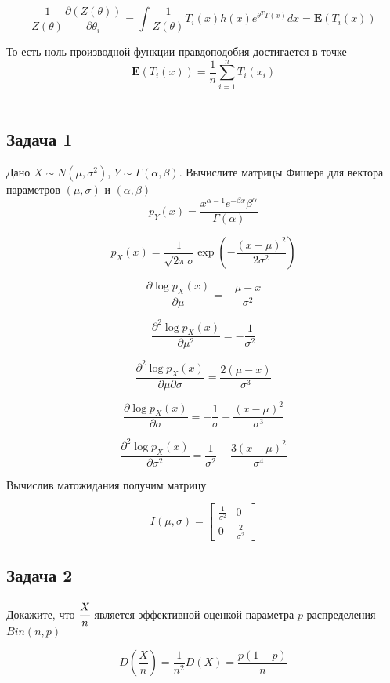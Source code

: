 \documentclass[
paper = a4,
fontsize = 12pt,
headinclude = true,
open = right,
twoside = true,
BCOR = 10mm,
toc = listofnumbered,
toc = bibnumbered,
numbers = noendperiod
]{scrreprt}
\begin{document}
	$$\frac{1}{Z(\theta)}\frac{\partial(Z(\theta))}{\partial \theta_{i}} =  \int \frac{1}{Z(\theta)}T_{i}(x)h(x)e^{\theta^{T}T(x)}dx = \mathbf{E}(T_{i}(x))$$
	
	То есть ноль производной функции правдоподобия достигается в точке
	$$\mathbf{E}(T_{i}(x)) = \frac{1}{n}\sum_{i = 1}^{n}T_{i}(x_{i})$$
	\\
	
		
	
	\subsection*{Задача 1}
	
	Дано $X \sim N(\mu, \sigma^{2})$, $Y\sim\Gamma(\alpha, \beta)$. Вычислите матрицы Фишера для вектора параметров $(\mu, \sigma)$ и $(\alpha, \beta)$
	$$p_{Y}(x) = \frac{x^{\alpha - 1}e^{-\beta x}\beta^{\alpha}}{\Gamma(\alpha)}$$
	
	$$p_{X}(x) = \frac{1}{\sqrt{2\pi}\sigma}\exp\left(-\frac{(x - \mu)^{2}}{2\sigma^{2}}\right)$$
	
	$$\frac{\partial \log p_{X}(x)}{\partial \mu} = -\frac{\mu - x}{\sigma^{2}}$$
	
	$$\frac{\partial^{2} \log p_{X}(x)}{\partial \mu^{2}} = -\frac{1}{\sigma^{2}}$$
	
	$$\frac{\partial^{2} \log p_{X}(x)}{\partial \mu\partial\sigma} = \frac{2(\mu - x)}{\sigma^{3}}$$
	
	$$\frac{\partial \log p_{X}(x)}{\partial \sigma} = -\frac{1}{\sigma} + \frac{(x - \mu)^{2}}{\sigma^{3}}$$
	
	$$\frac{\partial^{2} \log p_{X}(x)}{\partial \sigma^{2}} = \frac{1}{\sigma^{2}} - \frac{3(x - \mu)^{2}}{\sigma^{4}}$$
	
	Вычислив матожидания получим матрицу
	
	$$I(\mu, \sigma) = 
	\begin{bmatrix*}
		\frac{1}{\sigma^{2}} & 0 \\
		0 & \frac{2}{\sigma^{2}}
	\end{bmatrix*}$$
	
	
	\subsection*{Задача 2}
	
	Докажите, что $\cfrac{X}{n}$ является эффективной оценкой параметра $p$ распределения $Bin(n, p)$
	
	$$D\left(\frac{X}{n}\right) = \frac{1}{n^{2}}D(X) = \frac{p(1 - p)}{n}$$
	
\end{document}
